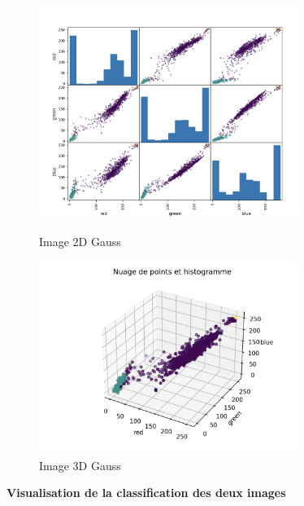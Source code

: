 \begin{figure}[!h]
    \begin{minipage}{.48\linewidth}
        \begin{center}
            \includegraphics[width=0.75\textwidth]{./img/7.2.1.png}
                \caption{\label{fig:6.4.1}Image 2D Gauss}  
            \end{center}
    \end{minipage}\hfill
    \begin{minipage}{.48\linewidth}
        \begin{center}
            \includegraphics[width=0.75\textwidth]{./img/7.2.2.png}
            \caption{\label{fig:6.4.2}Image 3D Gauss}  
        \end{center}
    \end{minipage}
\end{figure}




\textbf{Visualisation de la classification des deux images} \\

